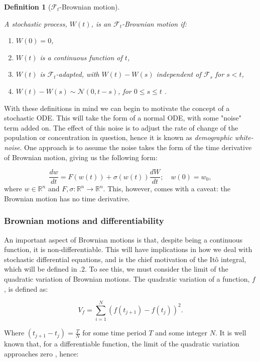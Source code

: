 \documentclass[12pt]{article}
\newtheorem{definition}{Definition}[section]
\begin{document}
\begin{definition}[$\mathcal{F}_t$-Brownian motion]\cite{Lord}

A stochastic process, $W(t)$, is an $\mathcal{F}_t$-Brownian motion if:
\begin{enumerate}
\item[(i)]$W(0) = 0$,
\item[(ii)] $W(t)$ is a continuous function of $t$,
\item[(iii)]$W(t)$ is $\mathcal{F}_t$-adapted, with $W(t)-W(s)$ independent of $\mathcal{F}_s$ for $s<t$,
\item[(iv)] $W(t)-W(s) \sim \mathcal{N}(0,t-s)$, for $0 \leq s \leq t$ \cite{Lord}.
\end{enumerate}

\end{definition}
With these definitions in mind we can begin to motivate the concept of a stochastic ODE. This will take the form of a normal ODE, with some "noise" term added on. The effect of this noise is to adjust the rate of change of the population or concentration in question, hence it is known as \textit{demographic white-noise}. One approach is to assume the noise takes the form of the time derivative of Brownian motion, giving us the following form:

  \begin{equation}\label{SODE}
  \frac{d w}{d t} = F(w(t)) + \sigma(w(t)) \frac{d W}{d t}; \quad w(0) = w_0,
  \end{equation}
 where $w \in \mathbb{R}^n$ and $F,\sigma: \mathbb{R}^n \to \mathbb{R}^n$. This, however, comes with a caveat: the Brownian motion has no time derivative. 
\subsubsection{Brownian motions and differentiability}
An important aspect of Brownian motions is that, despite being a continuous function, it is non-differentiable. This will have implications in how we deal with stochastic differential equations, and is the chief motivation of the It\^{o} integral, which will be defined in .2. To see this, we must consider the limit of the quadratic variation of Brownian motions. The quadratic variation of a function, $f$, is defined as:

$$V_f = \sum_{i=1}^N\left(f(t_{j+1}) - f(t_j)\right)^2.$$

Where $(t_{j+1} - t_j) = \frac{T}{N}$ for some time period $T$ and some integer $N$. It is well known that, for a differentiable function, the limit of the quadratic variation approaches zero \cite{Lee}, hence:
\end{document}
